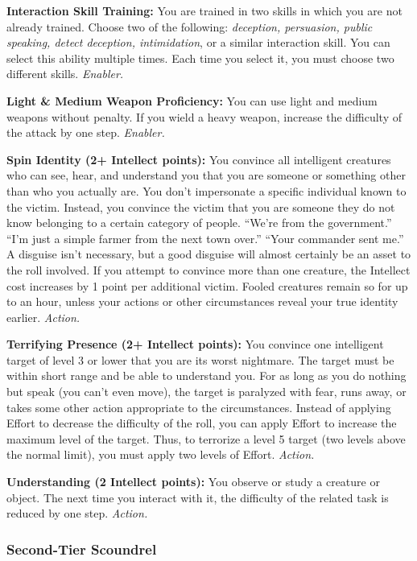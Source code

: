 \documentclass[a4paper,10pt,final,twocolumn,oneside]{book}
\newcommand{\itemAbility}[2]{\textcolor{25gray}{\textbullet\textbf{ #1:}}{ #2}\par}
\newcommand{\enabler}{\textit{ Enabler.}}
\newcommand{\action}{\textit{ Action.}}
\begin{document}
\itemAbility{Interaction Skill Training}{You are trained in two skills in which you are not already trained. Choose two of the following: \textit{deception, persuasion, public speaking, detect deception, intimidation}, or a similar interaction skill. You can select this ability multiple times. Each time you select it, you must choose two different skills.\enabler}

\itemAbility{Light \& Medium Weapon Proficiency}{You can use light and medium weapons without penalty. If you wield a heavy weapon, increase the difficulty of the attack by one step.\enabler}

\itemAbility{Spin Identity (2+ Intellect points)}{You convince all intelligent creatures who can see, hear, and understand you that you are someone or something other than who you actually are. You don’t impersonate a specific individual known to the victim. Instead, you convince the victim that you are someone they do not know belonging to a certain category of people. “We’re from the government.” “I’m just a simple farmer from the next town over.” “Your commander sent me.” A disguise isn’t necessary, but a good disguise will almost certainly be an asset to the roll involved. If you attempt to convince more than one creature, the Intellect cost increases by 1 point per additional victim. Fooled creatures remain so for up to an hour, unless your actions or other circumstances reveal your true identity earlier.\action}

\itemAbility{Terrifying Presence (2+ Intellect points)}{ You convince one intelligent target of level 3 or lower that you are its worst nightmare. The target must be within short range and be able to understand you. For as long as you do nothing but speak (you can’t even move), the target is paralyzed with fear, runs away, or takes some other action appropriate to the circumstances. Instead of applying Effort to decrease the difficulty of the roll, you can apply Effort to increase the maximum level of the target. Thus, to terrorize a level 5 target (two levels above the normal limit), you must apply two levels of Effort.\action}

\itemAbility{Understanding (2 Intellect points)}{You observe or study a creature or object. The next time you interact with it, the difficulty of the related task is reduced by one step.\action}


\subsubsection*{Second-Tier Scoundrel}
\label{subsub:scoundrelSecondTier}
\end{document}
